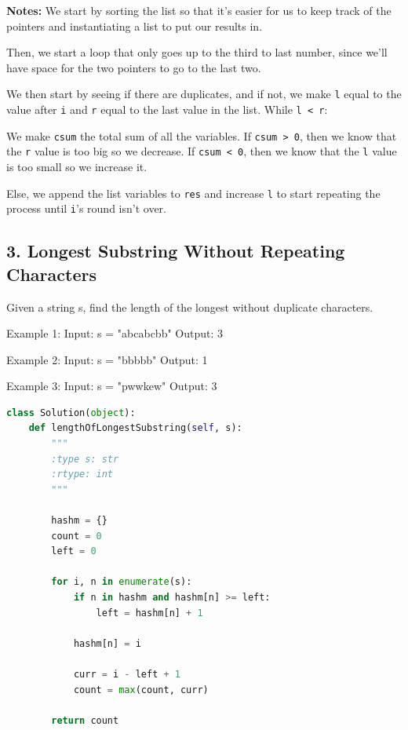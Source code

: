 \documentclass[11pt]{article}
\begin{document}
\noindent \textbf{Notes:} We start by sorting the list so that it's easier for us to keep track of the pointers and instantiating a list to put our results in.

\noindent Then, we start a loop that only goes up to the third to last number, since we'll have space for the two pointers to go to the last two. 

\noindent We then start by seeing if there are duplicates, and if not, we make \texttt{l} equal to the value after \texttt{i} and \texttt{r} equal to the last value in the list. While \texttt{l < r}:

\noindent We make \texttt{csum} the total sum of all the variables. If \texttt{csum > 0}, then we know that the \texttt{r} value is too big so we decrease. If \texttt{csum < 0}, then we know that the \texttt{l} value is too small so we increase it.

\noindent Else, we append the list variables to \texttt{res} and increase \texttt{l} to start repeating the process until \texttt{i}'s round isn't over. 




\subsection*{3. Longest Substring Without Repeating Characters}
Given a string s, find the length of the longest without duplicate characters.

 

Example 1:
Input: s = "abcabcbb"
Output: 3

Example 2:
Input: s = "bbbbb"
Output: 1

Example 3:
Input: s = "pwwkew"
Output: 3

\begin{lstlisting}[language=python, mathescape=true]
class Solution(object):
    def lengthOfLongestSubstring(self, s):
        """
        :type s: str
        :rtype: int
        """

        hashm = {}
        count = 0
        left = 0

        for i, n in enumerate(s):
            if n in hashm and hashm[n] >= left: 
                left = hashm[n] + 1
            
            hashm[n] = i

            curr = i - left + 1
            count = max(count, curr)

        return count
        
\end{lstlisting}
\end{document}
